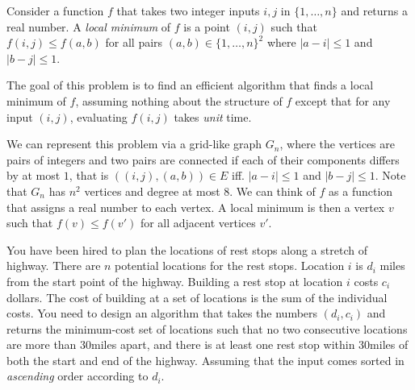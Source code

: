 \documentclass[12pt,answers,addpoints]{exam}
\begin{document}
\begin{questions}
\begin{parts}
  \end{parts}
\newpage

\question Consider a function $f$ that takes two integer inputs $i,j$
  in $\{1,\ldots,n\}$ and returns a real number. A \emph{local
    minimum} of $f$ is a point $(i,j)$ such that $f(i,j) \leq f(a,b)$
  for all pairs $(a,b)\in \{1,\ldots,n\}^2$ where $|a - i| \leq 1$ and
  $|b-j| \leq 1$.

    The goal of this problem is to find an efficient algorithm that
    finds a local minimum of $f$, assuming nothing about the structure
    of $f$ except that for any input $(i,j)$, evaluating $f(i,j)$
    takes \emph{unit} time. 

    We can represent this problem via a grid-like graph $G_n$, where
    the vertices are pairs of integers and two pairs are connected if
    each of their components differs by at most $1$, that is
    $((i,j),(a,b))\in E$ iff. $|a - i| \leq 1$ and $|b - j| \leq
    1$. Note that $G_n$ has $n^2$ vertices and degree at most $8$. We
    can think of $f$ as a function that assigns a real number to each
    vertex. A local minimum is then a vertex $v$ such that
    $f(v) \leq f(v')$ for all adjacent vertices $v'$.
\newpage
\question You have been hired to plan the locations of rest stops
  along a stretch of highway. There are $n$ potential locations for
  the rest stops. Location $i$ is $d_i$ miles from the start point of
  the highway. Building a rest stop at location $i$ costs $c_i$
  dollars. The cost of building at a set of locations is the sum of
  the individual costs. You need to design an algorithm that takes the
  numbers $(d_i,c_i)$ and returns the minimum-cost set of locations
  such that no two consecutive locations are more than 30miles apart,
  and there is at least one rest stop within 30miles of both the start
  and end of the highway. Assuming that the input comes sorted in
  \emph{ascending} order according to $d_i$.


\end{questions}
\end{document}
